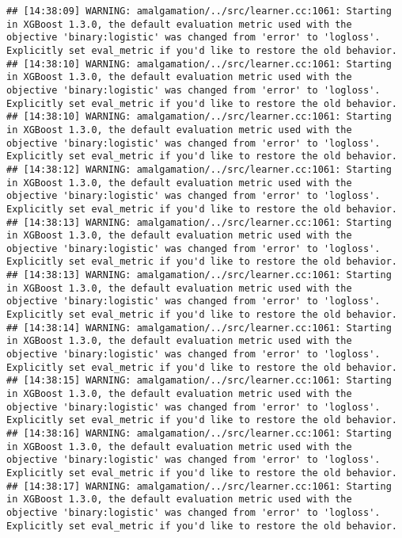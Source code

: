 \documentclass[
]{book}
\begin{document}
\begin{verbatim}
## [14:38:09] WARNING: amalgamation/../src/learner.cc:1061: Starting in XGBoost 1.3.0, the default evaluation metric used with the objective 'binary:logistic' was changed from 'error' to 'logloss'. Explicitly set eval_metric if you'd like to restore the old behavior.
## [14:38:10] WARNING: amalgamation/../src/learner.cc:1061: Starting in XGBoost 1.3.0, the default evaluation metric used with the objective 'binary:logistic' was changed from 'error' to 'logloss'. Explicitly set eval_metric if you'd like to restore the old behavior.
## [14:38:10] WARNING: amalgamation/../src/learner.cc:1061: Starting in XGBoost 1.3.0, the default evaluation metric used with the objective 'binary:logistic' was changed from 'error' to 'logloss'. Explicitly set eval_metric if you'd like to restore the old behavior.
## [14:38:12] WARNING: amalgamation/../src/learner.cc:1061: Starting in XGBoost 1.3.0, the default evaluation metric used with the objective 'binary:logistic' was changed from 'error' to 'logloss'. Explicitly set eval_metric if you'd like to restore the old behavior.
## [14:38:13] WARNING: amalgamation/../src/learner.cc:1061: Starting in XGBoost 1.3.0, the default evaluation metric used with the objective 'binary:logistic' was changed from 'error' to 'logloss'. Explicitly set eval_metric if you'd like to restore the old behavior.
## [14:38:13] WARNING: amalgamation/../src/learner.cc:1061: Starting in XGBoost 1.3.0, the default evaluation metric used with the objective 'binary:logistic' was changed from 'error' to 'logloss'. Explicitly set eval_metric if you'd like to restore the old behavior.
## [14:38:14] WARNING: amalgamation/../src/learner.cc:1061: Starting in XGBoost 1.3.0, the default evaluation metric used with the objective 'binary:logistic' was changed from 'error' to 'logloss'. Explicitly set eval_metric if you'd like to restore the old behavior.
## [14:38:15] WARNING: amalgamation/../src/learner.cc:1061: Starting in XGBoost 1.3.0, the default evaluation metric used with the objective 'binary:logistic' was changed from 'error' to 'logloss'. Explicitly set eval_metric if you'd like to restore the old behavior.
## [14:38:16] WARNING: amalgamation/../src/learner.cc:1061: Starting in XGBoost 1.3.0, the default evaluation metric used with the objective 'binary:logistic' was changed from 'error' to 'logloss'. Explicitly set eval_metric if you'd like to restore the old behavior.
## [14:38:17] WARNING: amalgamation/../src/learner.cc:1061: Starting in XGBoost 1.3.0, the default evaluation metric used with the objective 'binary:logistic' was changed from 'error' to 'logloss'. Explicitly set eval_metric if you'd like to restore the old behavior.

\end{verbatim}
\end{document}
